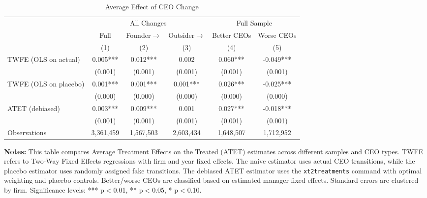 \begin{table}[]
    \centering
    \caption{Average Effect of CEO Change}
    \vspace{.2cm}
    \label{tab:placeholder}
\begin{tabular}{lccccc}
\toprule
 & \multicolumn{3}{c}{All Changes} & \multicolumn{2}{c}{Full Sample} \\
\cmidrule(lr){2-4} \cmidrule(lr){5-6}
 & Full & Founder$\to$ & Outsider$\to$ & Better CEOs & Worse CEOs \\
 & (1) & (2) & (3) & (4) & (5) \\
\midrule
TWFE (OLS on actual) & 0.005*** & 0.012*** & 0.002 & 0.060*** & -0.049*** \\
  & (0.001) & (0.001) & (0.001) & (0.001) & (0.001) \\
TWFE (OLS on placebo) & 0.001*** & 0.001*** & 0.001*** & 0.026*** & -0.025*** \\
  & (0.000) & (0.000) & (0.000) & (0.000) & (0.000) \\
ATET (debiased) & 0.003*** & 0.009*** & 0.001 & 0.027*** & -0.018*** \\
  & (0.001) & (0.001) & (0.001) & (0.001) & (0.001) \\ \hline
Observations & 3,361,459 & 1,567,503 & 2,603,434 & 1,648,507 & 1,712,952 \\
\bottomrule
\end{tabular}
   \begin{minipage}{16cm}
   \vspace{.2cm}
\footnotesize
\item \textbf{Notes:} This table compares Average Treatment Effects on the Treated (ATET) estimates 
across different samples and CEO types. TWFE refers to Two-Way Fixed Effects regressions 
with firm and year fixed effects. The naive estimator uses actual CEO transitions, 
while the placebo estimator uses randomly assigned fake transitions. The debiased 
ATET estimator uses the \texttt{xt2treatments} command with optimal weighting and 
placebo controls. Better/worse CEOs are classified based on estimated manager fixed effects. 
Standard errors are clustered by firm. Significance levels: *** p$<$0.01, ** p$<$0.05, * p$<$0.10.
   \end{minipage}
\end{table}



